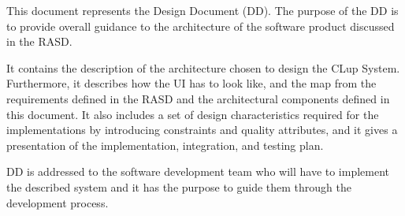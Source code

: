 This document represents the Design Document (DD). The purpose of the DD is to provide overall guidance to the architecture of the software product discussed in the RASD.

It contains the description of the architecture chosen to design the CLup System. Furthermore, it describes how the UI has to look like, and the map from the requirements defined in the RASD and the architectural components defined in this document.
It also includes a set of design characteristics required for the implementations by introducing constraints and quality attributes, and it gives a presentation of the implementation, integration, and testing plan.

DD is addressed to the software development team who will have to implement the described system and it has the purpose to guide them through the development process.